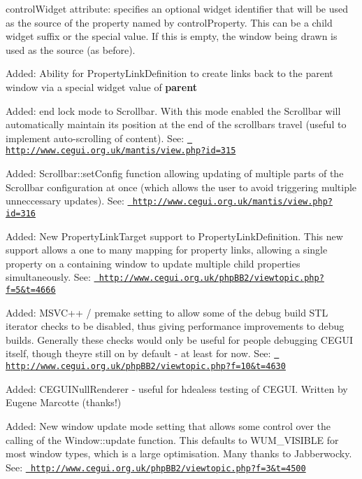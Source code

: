 \begin{DoxyItemize}
\begin{DoxyItemize}
\item control\+Widget attribute\+: specifies an optional widget identifier that will be used as the source of the property named by control\+Property. This can be a child widget suffix or the special \textquotesingle{} value. If this is empty, the window being drawn is used as the source (as before).
\end{DoxyItemize}
\item Added\+: Ability for Property\+Link\+Definition to create links back to the parent window via a special widget value of {\bfseries{parent}}
\item Added\+: \textquotesingle{}end lock\textquotesingle{} mode to Scrollbar. With this mode enabled the Scrollbar will automatically maintain it\textquotesingle{}s position at the end of the scrollbar\textquotesingle{}s travel (useful to implement auto-\/scrolling of content). See\+: \href{http://www.cegui.org.uk/mantis/view.php?id=315}{\texttt{ http\+://www.\+cegui.\+org.\+uk/mantis/view.\+php?id=315}}
\item Added\+: Scrollbar\+::set\+Config function allowing updating of multiple parts of the Scrollbar configuration at once (which allows the user to avoid triggering multiple unneccessary updates). See\+: \href{http://www.cegui.org.uk/mantis/view.php?id=316}{\texttt{ http\+://www.\+cegui.\+org.\+uk/mantis/view.\+php?id=316}}
\item Added\+: New Property\+Link\+Target support to Property\+Link\+Definition. This new support allows a one to many mapping for property links, allowing a single property on a containing window to update multiple child properties simultaneously. See\+: \href{http://www.cegui.org.uk/phpBB2/viewtopic.php?f=5&t=4666}{\texttt{ http\+://www.\+cegui.\+org.\+uk/php\+B\+B2/viewtopic.\+php?f=5\&t=4666}}
\item Added\+: M\+S\+V\+C++ / premake setting to allow some of the debug build S\+TL iterator checks to be disabled, thus giving performance improvements to debug builds. Generally these checks would only be useful for people debugging C\+E\+G\+UI itself, though they\textquotesingle{}re still on by default -\/ at least for now. See\+: \href{http://www.cegui.org.uk/phpBB2/viewtopic.php?f=10&t=4630}{\texttt{ http\+://www.\+cegui.\+org.\+uk/php\+B\+B2/viewtopic.\+php?f=10\&t=4630}}
\item Added\+: C\+E\+G\+U\+I\+Null\+Renderer -\/ useful for hdealess testing of C\+E\+G\+UI. Written by Eugene Marcotte (thanks!)
\item Added\+: New window update mode setting that allows some control over the calling of the Window\+::update function. This defaults to W\+U\+M\+\_\+\+V\+I\+S\+I\+B\+LE for most window types, which is a large optimisation. Many thanks to Jabberwocky. See\+: \href{http://www.cegui.org.uk/phpBB2/viewtopic.php?f=3&t=4500}{\texttt{ http\+://www.\+cegui.\+org.\+uk/php\+B\+B2/viewtopic.\+php?f=3\&t=4500}}

\end{DoxyItemize}
